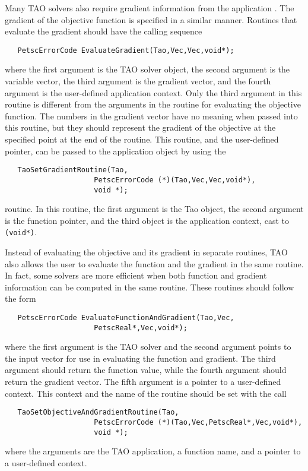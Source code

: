 Many TAO solvers also require gradient information from the 
application .
  The gradient of the objective function is specified in a similar manner.
Routines that evaluate the gradient should have the calling sequence
\begin{verbatim}
   PetscErrorCode EvaluateGradient(Tao,Vec,Vec,void*);
\end{verbatim}
\noindent
where the first
argument is the TAO solver object, the second argument is the variable
vector, the third argument is the gradient vector, and the fourth argument is
the user-defined application context.  Only the third argument in this
routine is different from the arguments in the routine for evaluating
the objective function.  The numbers in the gradient vector have no
meaning when passed into this routine, but they should represent the gradient
of the objective at the specified point at the end of the routine.
This routine, and the user-defined pointer, can be passed to the application
object by using the  
\begin{verbatim}
   TaoSetGradientRoutine(Tao,
                     PetscErrorCode (*)(Tao,Vec,Vec,void*),
                     void *);
\end{verbatim}
routine. 
In this routine, the first argument is the Tao object, the second argument
is the function pointer, and the third object is the application context, cast
to {\tt (void*)}.

Instead of evaluating the objective and its gradient in separate
routines, TAO also allows the user to evaluate the function and the gradient
in the same routine.  In fact, some solvers are more efficient when
both function and gradient information can be computed in the same routine.
These routines should follow the form
\begin{verbatim}
   PetscErrorCode EvaluateFunctionAndGradient(Tao,Vec,
                     PetscReal*,Vec,void*);
\end{verbatim}
\noindent
where the first
argument is the TAO solver and the second
argument points to the input vector for use in evaluating the
function and gradient. The third argument should return the
function value, while the fourth argument should return the gradient vector.
The fifth argument is a pointer to a user-defined context.
This context and the name of the routine should be set with the
call 
\begin{verbatim}
   TaoSetObjectiveAndGradientRoutine(Tao,
                     PetscErrorCode (*)(Tao,Vec,PetscReal*,Vec,void*),
                     void *);
\end{verbatim}
where the arguments are the TAO application, a
function name, and a pointer to a user-defined context.


